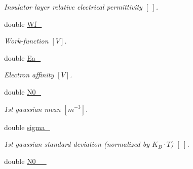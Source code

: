 \begin{DoxyCompactItemize}
\begin{DoxyCompactList}\small\item\em Insulator layer relative electrical permittivity $ \left[ ~ \right] $. \end{DoxyCompactList}\item 
\hypertarget{classParamList_abdbc36c238ba50f2a0e2bc72298f5752}{double \hyperlink{classParamList_abdbc36c238ba50f2a0e2bc72298f5752}{Wf\-\_\-}}\label{classParamList_abdbc36c238ba50f2a0e2bc72298f5752}

\begin{DoxyCompactList}\small\item\em Work-\/function $ \left[ V \right] $. \end{DoxyCompactList}\item 
\hypertarget{classParamList_ad6c06799c99e628d22b697bc5977a598}{double \hyperlink{classParamList_ad6c06799c99e628d22b697bc5977a598}{Ea\-\_\-}}\label{classParamList_ad6c06799c99e628d22b697bc5977a598}

\begin{DoxyCompactList}\small\item\em Electron affinity $ \left[ V \right] $. \end{DoxyCompactList}\item 
\hypertarget{classParamList_ab02f44dcc57ae9925ef021ac2856ed0b}{double \hyperlink{classParamList_ab02f44dcc57ae9925ef021ac2856ed0b}{N0\-\_\-}}\label{classParamList_ab02f44dcc57ae9925ef021ac2856ed0b}

\begin{DoxyCompactList}\small\item\em 1st gaussian mean $ \left[ m^{-3} \right] $. \end{DoxyCompactList}\item 
\hypertarget{classParamList_a497f69dd5195462ce23e591069b4232f}{double \hyperlink{classParamList_a497f69dd5195462ce23e591069b4232f}{sigma\-\_\-}}\label{classParamList_a497f69dd5195462ce23e591069b4232f}

\begin{DoxyCompactList}\small\item\em 1st gaussian standard deviation (normalized by $ K_B \cdot T $) $ \left[ ~ \right] $. \end{DoxyCompactList}\item 
\hypertarget{classParamList_a6ebf9f469e500f05185919e534c6f6d4}{double \hyperlink{classParamList_a6ebf9f469e500f05185919e534c6f6d4}{N0\-\_\-\_\-}}\label{classParamList_a6ebf9f469e500f05185919e534c6f6d4}


\end{DoxyCompactItemize}
